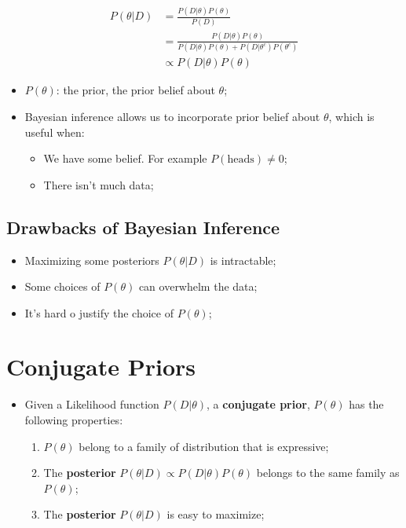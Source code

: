     \begin{align}
      P\left( \theta | D \right) &= \frac{ P\left( D | \theta \right) P\left( \theta \right) }{ P\left( D \right) } \\
      &= \frac{ P\left( D | \theta \right) P\left( \theta \right) }{ P\left( D | \theta \right) P\left( \theta \right) + P\left( D | \theta^{c} \right) P\left( \theta^{c} \right) } \\
      &\propto P\left( D | \theta \right) P\left( \theta \right)
    \end{align}
    
    \begin{itemize}
      \item $ P\left( \theta \right) $: the prior, the prior belief about $ \theta $;
      \item Bayesian inference allows us to incorporate prior belief about $ \theta $, which is useful when:
      \begin{itemize}
        \item We have some belief. For example $ P\left( \text{heads} \right) \ne 0 $;
        \item There isn't much data;
      \end{itemize}
    \end{itemize}
    
  \subsection{Drawbacks of Bayesian Inference}
  
    \begin{itemize}
      \item Maximizing some posteriors $ P\left( \theta | D \right) $ is intractable;
      \item Some choices of $ P\left( \theta \right) $ can overwhelm the data;
      \item It's hard o justify the choice of $ P\left( \theta \right) $;
    \end{itemize}
    
\section{Conjugate Priors}

  \begin{itemize}
    \item Given a Likelihood function $ P\left( D | \theta \right) $, a \textbf{conjugate prior}, $ P\left( \theta \right) $ has the following properties:
    \begin{enumerate}
      \item $ P\left( \theta \right) $ belong to a family of distribution that is expressive;
      \item The \textbf{posterior} $ P\left( \theta | D \right) \propto P\left( D | \theta \right) P\left( \theta \right) $ belongs to the same family as $ P\left( \theta \right) $;
      \item The \textbf{posterior} $ P\left( \theta | D \right) $ is easy to maximize;
    \end{enumerate}
  \end{itemize}
  
